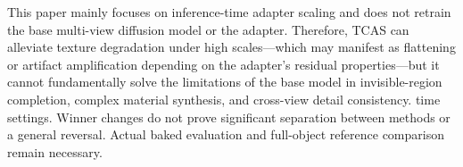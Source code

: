 \documentclass[times,twocolumn,final]{elsarticle}
\providecommand{\DIFadd}[1]{{\protect\color{blue} \sf #1}} %
\providecommand{\DIFdel}[1]{{\protect\color{red} \scriptsize #1}} %
\providecommand{\DIFaddbegin}{} %
\providecommand{\DIFaddend}{} %
\providecommand{\DIFdelend}{} %
\begin{document}


\DIFdel{This paper mainly focuses on inference-time adapter scaling and does not retrain the base multi-view diffusion model or the adapter. Therefore, TCAS can alleviate texture degradation under high scales---which may manifest as flattening or artifact amplification depending on the adapter's residual properties---but it cannot fundamentally solve the limitations of the base model in invisible-region completion, complex material synthesis, and cross-view detail consistency.
}\DIFdelend \DIFaddbegin \DIFadd{time settings. Winner changes do not prove significant separation between methods or a general reversal. Actual baked evaluation and full-object reference comparison remain necessary.
}\DIFaddend 
\end{document}
